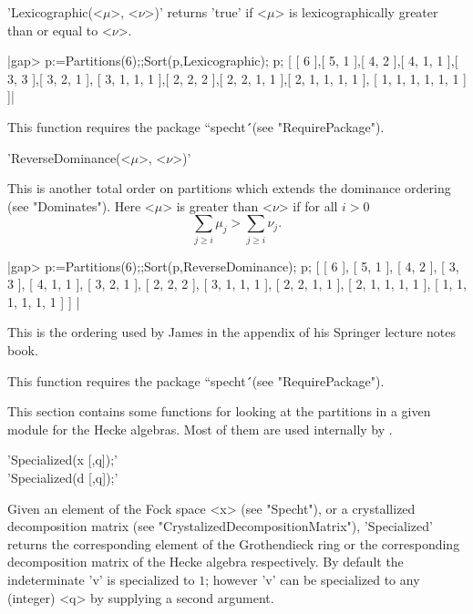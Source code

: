 'Lexicographic(<$\mu$>, <$\nu$>)' returns 'true' if <$\mu$> is 
lexicographically greater than or equal to <$\nu$>.

|gap> p:=Partitions(6);;Sort(p,Lexicographic); p;
[ [ 6 ],[ 5, 1 ],[ 4, 2 ],[ 4, 1, 1 ],[ 3, 3 ],[ 3, 2, 1 ],
  [ 3, 1, 1, 1 ],[ 2, 2, 2 ],[ 2, 2, 1, 1 ],[ 2, 1, 1, 1, 1 ],
  [ 1, 1, 1, 1, 1, 1 ] ]|

This function requires the package ``specht\'\'\ (see "RequirePackage").



'ReverseDominance(<$\mu$>, <$\nu$>)'

This is another total order on partitions which extends the dominance 
ordering (see "Dominates"). Here <$\mu$> is greater than <$\nu$> if for 
all $i>0$
$$ \sum_{j\ge i}\mu_j > \sum_{j\ge i}\nu_j. $$

|gap> p:=Partitions(6);;Sort(p,ReverseDominance); p;
[ [ 6 ], [ 5, 1 ], [ 4, 2 ], [ 3, 3 ], [ 4, 1, 1 ], [ 3, 2, 1 ], 
  [ 2, 2, 2 ], [ 3, 1, 1, 1 ], [ 2, 2, 1, 1 ], [ 2, 1, 1, 1, 1 ], 
  [ 1, 1, 1, 1, 1, 1 ] ] |

This is the ordering used by James in the appendix of his Springer
lecture notes book.

This function requires the package ``specht\'\'\ (see "RequirePackage").



This section contains some functions for looking at the partitions in a
given module for the Hecke algebras. Most of them are used internally by
\Specht.


'Specialized(x [,q]);'\\
'Specialized(d [,q]);'

Given an element of the Fock space <x> (see "Specht"), or a crystallized
decomposition matrix (see "CrystalizedDecompositionMatrix"), 'Specialized'
returns the corresponding element of the Grothendieck ring or the
corresponding decomposition matrix of the Hecke algebra respectively. By
default the indeterminate 'v' is specialized to $1$; however 'v' can be
specialized to any (integer) <q> by supplying a second argument.

